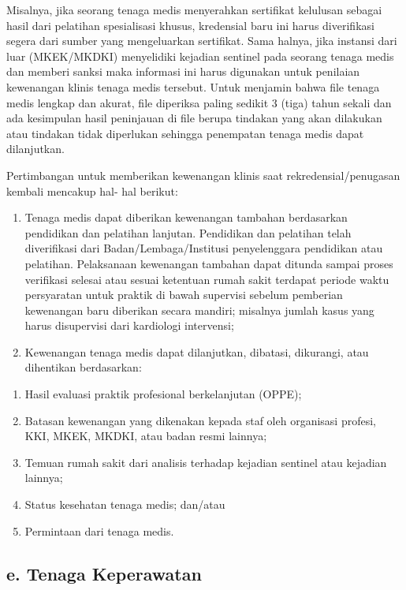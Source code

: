 \documentclass[
]{book}
\providecommand{\tightlist}{%
  \setlength{\itemsep}{0pt}\setlength{\parskip}{0pt}}
\begin{document}
Misalnya, jika seorang tenaga medis menyerahkan sertifikat kelulusan sebagai hasil dari pelatihan spesialisasi khusus, kredensial baru ini harus diverifikasi segera dari sumber yang mengeluarkan sertifikat. Sama halnya, jika instansi dari luar (MKEK/MKDKI) menyelidiki kejadian sentinel pada seorang tenaga medis dan memberi sanksi maka informasi ini harus digunakan untuk penilaian kewenangan klinis tenaga medis tersebut. Untuk menjamin bahwa file tenaga medis lengkap dan akurat, file diperiksa paling sedikit 3 (tiga) tahun sekali dan ada kesimpulan hasil peninjauan di file berupa tindakan yang akan dilakukan atau tindakan tidak diperlukan sehingga penempatan tenaga medis dapat dilanjutkan.

Pertimbangan untuk memberikan kewenangan klinis saat rekredensial/penugasan kembali mencakup hal- hal berikut:

\begin{enumerate}
\def\labelenumi{\arabic{enumi}.}
\tightlist
\item
  Tenaga medis dapat diberikan kewenangan tambahan berdasarkan pendidikan dan pelatihan lanjutan. Pendidikan dan pelatihan telah diverifikasi dari Badan/Lembaga/Institusi penyelenggara pendidikan atau pelatihan. Pelaksanaan kewenangan tambahan dapat ditunda sampai proses verifikasi selesai atau sesuai ketentuan rumah sakit terdapat periode waktu persyaratan untuk praktik di bawah supervisi sebelum pemberian kewenangan baru diberikan secara mandiri; misalnya jumlah kasus yang harus disupervisi dari kardiologi intervensi;
\item
  Kewenangan tenaga medis dapat dilanjutkan, dibatasi, dikurangi, atau dihentikan berdasarkan:
\end{enumerate}

\begin{enumerate}
\def\labelenumi{\alph{enumi}.}
\tightlist
\item
  Hasil evaluasi praktik profesional berkelanjutan (OPPE);
\item
  Batasan kewenangan yang dikenakan kepada staf oleh organisasi profesi, KKI, MKEK, MKDKI, atau badan resmi lainnya;
\item
  Temuan rumah sakit dari analisis terhadap kejadian sentinel atau kejadian lainnya;
\item
  Status kesehatan tenaga medis; dan/atau
\item
  Permintaan dari tenaga medis.
\end{enumerate}

\hypertarget{e.-tenaga-keperawatan}{%
\subsection*{e. Tenaga Keperawatan}\label{e.-tenaga-keperawatan}}
\end{document}
